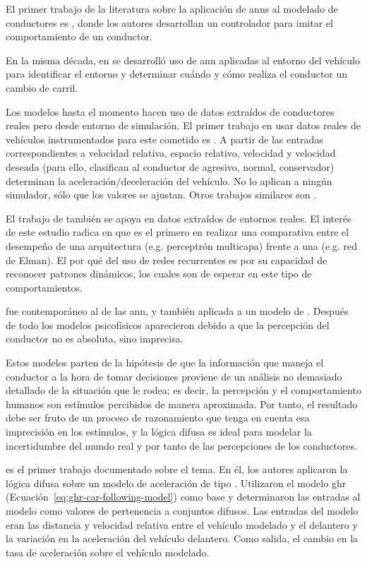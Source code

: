 El primer trabajo de la literatura sobre la aplicación de \glspl{ann} al modelado de conductores es \cite{Fix1990}, donde los autores desarrollan un controlador para imitar el comportamiento de un conductor.

En la misma década, en \cite{Hunt1994} se desarrolló uso de \gls{ann} aplicadas al entorno del vehículo para identificar el entorno y determinar cuándo y cómo realiza el conductor un cambio de carril.

Los modelos hasta el momento hacen uso de datos extraídos de conductores reales pero desde entorno de simulación. El primer trabajo en usar datos reales de vehículos instrumentados para este cometido es \cite{Jia2003}. A partir de las entradas correspondientes a velocidad relativa, espacio relativo, velocidad y velocidad deseada (para ello, clasifican al conductor de agresivo, normal, conservador) determinan la aceleración/deceleración del vehículo. No lo aplican a ningún simulador, sólo que los valores se ajustan. Otros trabajos similares son \cite{Panwai2007, Khodayari2012}.

El trabajo de \cite{Simonelli2009} también se apoya en datos extraídos de entornos reales. El interés de este estudio radica en que es el primero en realizar una comparativa entre el desempeño de una arquitectura \textit{} (e.g. perceptrón multicapa) frente a una  (e.g. red de Elman). El por qué del uso de redes recurrentes es por su capacidad de reconocer patrones dinámicos, los cuales son de esperar en este tipo de comportamientos.

 fue contemporáneo al de las \gls{ann}, y también aplicada a un modelo de \textit{}. Después de todo los modelos psicofísicos aparecieron debido a que la percepción del conductor no es absoluta, sino imprecisa.

Estos modelos parten de la hipótesis de que la información que maneja el conductor a la hora de tomar decisiones proviene de un análisis no demasiado detallado de la situación que le rodea; es decir, la percepción y el comportamiento humanos son estímulos percibidos de manera aproximada. Por tanto, el resultado debe ser fruto de un proceso de razonamiento que tenga en cuenta esa imprecisión en los estímulos, y la lógica difusa es ideal para modelar la incertidumbre del mundo real y por tanto de las percepciones de los conductores.

\cite{Kikuchi1992} es el primer trabajo documentado sobre el tema. En él, los autores aplicaron la lógica difusa sobre un modelo de aceleración de tipo \textit{}. Utilizaron el modelo \gls{ghr} (Ecuación~\ref{eq:ghr-car-following-model}) como base y determinaron las entradas al modelo como valores de pertenencia a conjuntos difusos. Las entradas del modelo eran las distancia y velocidad relativa entre el vehículo modelado y el delantero y la variación en la aceleración del vehículo delantero. Como salida, el cambio en la tasa de aceleración sobre el vehículo modelado.

